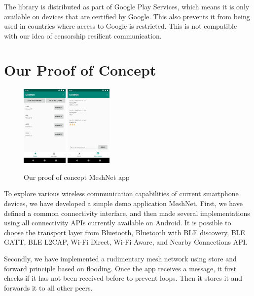 \documentclass[conference,compsoc]{IEEEtran}
\begin{document}
The library is distributed as part of Google Play Services, which means it is only available on devices that are certified by Google. This also prevents it from being used in countries where access to Google is restricted. This is not compatible with our idea of censorship resilient communication.


\section{Our Proof of Concept} \label{poc}

\begin{figure}[h]
  \centering
  \includegraphics[width=0.2\textwidth]{meshnet1} \includegraphics[width=0.2\textwidth]{meshnet2}
  \caption{Our proof of concept MeshNet app}
\end{figure}


To explore various wireless communication capabilities of current smartphone devices, we have developed a simple demo application MeshNet. First, we have defined a common connectivity interface, and then made several implementations using all connectivity APIs currently available on Android. It is possible to choose the transport layer from Bluetooth, Bluetooth with BLE discovery, BLE GATT, BLE L2CAP, Wi-Fi Direct, Wi-Fi Aware, and Nearby Connections API.

Secondly, we have implemented a rudimentary mesh network using store and forward principle based on flooding. Once the app receives a message, it first checks if it has not been received before to prevent loops. Then it stores it and forwards it to all other peers.
\end{document}
